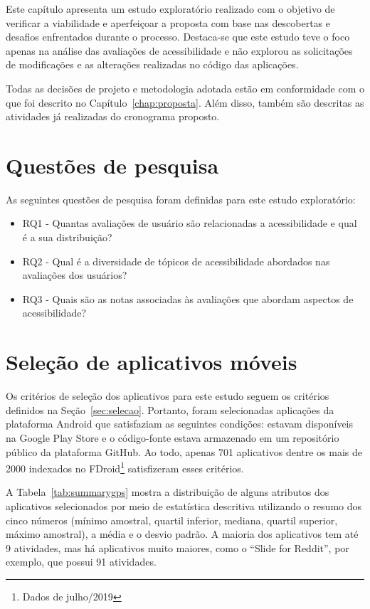Este capítulo apresenta um estudo exploratório realizado com o objetivo de verificar a viabilidade e aperfeiçoar a proposta com base nas descobertas e desafios enfrentados durante o processo. Destaca-se que este estudo teve o foco apenas na análise das avaliações de acessibilidade e não explorou as solicitações de modificações e as alterações realizadas no código das aplicações. 


Todas as decisões de projeto e metodologia adotada estão em conformidade com o que foi descrito no Capítulo~\ref{chap:proposta}.
Além disso, também são descritas as atividades já realizadas do cronograma proposto.

\section{Questões de pesquisa}

As seguintes questões de pesquisa foram definidas para este estudo exploratório:
\begin{itemize}
 \item RQ1 - Quantas avaliações de usuário são relacionadas a acessibilidade e qual é a sua distribuição? 
 \item RQ2 - Qual é a diversidade de tópicos de acessibilidade abordados nas avaliações dos usuários?
 \item RQ3 - Quais são as notas associadas às avaliações que abordam aspectos de acessibilidade?  
\end{itemize}

\section{Seleção de aplicativos móveis}

Os critérios de seleção dos aplicativos para este estudo seguem os critérios definidos na Seção~\ref{sec:selecao}. Portanto, foram selecionadas aplicações da plataforma Android que satisfaziam as seguintes condições: estavam disponíveis na Google Play Store e o código-fonte estava armazenado em um repositório público da plataforma GitHub. Ao todo, apenas 701 aplicativos dentre os mais de 2000  indexados no FDroid\footnote{Dados de julho/2019} satisfizeram esses critérios.

A Tabela~\ref{tab:summarygps} mostra a distribuição de alguns atributos dos aplicativos selecionados por meio de estatística descritiva utilizando o resumo dos cinco números (mínimo amostral, quartil inferior, 
mediana, quartil superior, máximo amostral), a média e o desvio padrão. 
A maioria dos aplicativos tem até 9 atividades, mas há aplicativos muito maiores, como o ``Slide for Reddit'', por exemplo, que possui 91 atividades.

